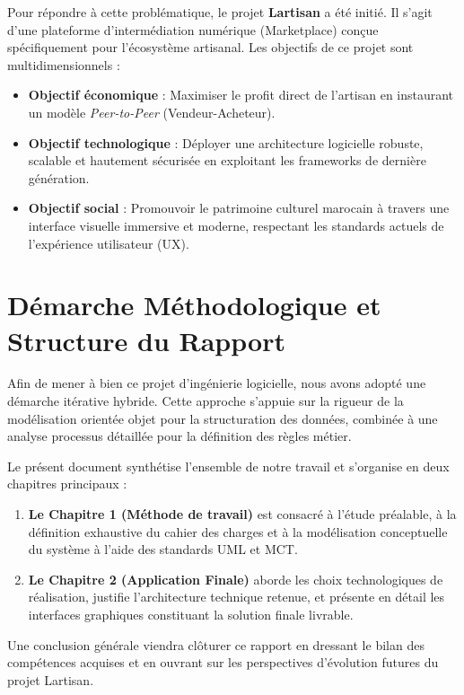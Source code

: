 \vspace{0.4cm}

Pour répondre à cette problématique, le projet \textbf{Lartisan} a été initié. Il s'agit d'une plateforme d'intermédiation numérique (Marketplace) conçue spécifiquement pour l'écosystème artisanal. Les objectifs de ce projet sont multidimensionnels :
\begin{itemize}
    \item \textbf{Objectif économique} : Maximiser le profit direct de l'artisan en instaurant un modèle \textit{Peer-to-Peer} (Vendeur-Acheteur).
    \item \textbf{Objectif technologique} : Déployer une architecture logicielle robuste, scalable et hautement sécurisée en exploitant les frameworks de dernière génération.
    \item \textbf{Objectif social} : Promouvoir le patrimoine culturel marocain à travers une interface visuelle immersive et moderne, respectant les standards actuels de l'expérience utilisateur (UX).
\end{itemize}

\section*{Démarche Méthodologique et Structure du Rapport}
Afin de mener à bien ce projet d'ingénierie logicielle, nous avons adopté une démarche itérative hybride. Cette approche s'appuie sur la rigueur de la modélisation orientée objet pour la structuration des données, combinée à une analyse processus détaillée pour la définition des règles métier.

Le présent document synthétise l'ensemble de notre travail et s'organise en deux chapitres principaux :
\begin{enumerate}
    \item \textbf{Le Chapitre 1 (Méthode de travail)} est consacré à l'étude préalable, à la définition exhaustive du cahier des charges et à la modélisation conceptuelle du système à l'aide des standards UML et MCT.
    \item \textbf{Le Chapitre 2 (Application Finale)} aborde les choix technologiques de réalisation, justifie l'architecture technique retenue, et présente en détail les interfaces graphiques constituant la solution finale livrable.
\end{enumerate}
Une conclusion générale viendra clôturer ce rapport en dressant le bilan des compétences acquises et en ouvrant sur les perspectives d'évolution futures du projet Lartisan.
